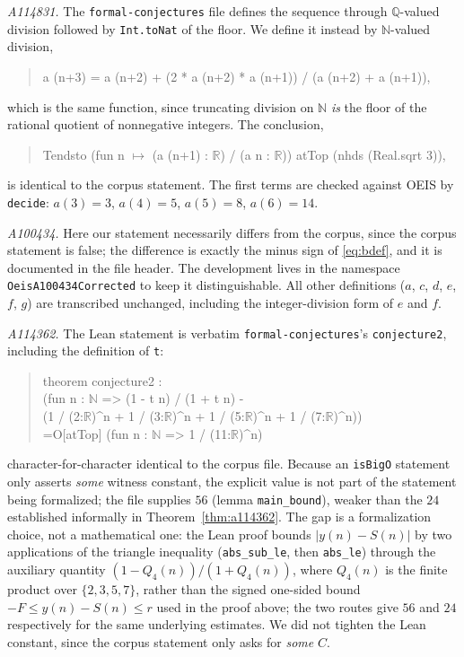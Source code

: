 \documentclass[11pt]{article}
\theoremstyle{plain}
\theoremstyle{definition}
\theoremstyle{remark}
\numberwithin{equation}{section}
\newcommand{\N}{\mathbb{N}}
\newcommand{\Q}{\mathbb{Q}}
\newcommand{\R}{\mathbb{R}}
\begin{document}
\emph{A114831.} The \texttt{formal-conjectures} file defines the sequence through
$\Q$-valued division followed by \texttt{Int.toNat} of the floor. We define it instead by
$\N$-valued division,
\begin{quote}\ttfamily\small
a (n+3) = a (n+2) + (2 * a (n+2) * a (n+1)) / (a (n+2) + a (n+1)),
\end{quote}
which is the same function, since truncating division on $\N$ \emph{is} the floor of the rational
quotient of nonnegative integers. The conclusion,
\begin{quote}\ttfamily\small
Tendsto (fun n $\mapsto$ (a (n+1) : $\R$) / (a n : $\R$)) atTop (nhds (Real.sqrt 3)),
\end{quote}
is identical to the corpus statement. The first terms are checked against OEIS by
\texttt{decide}: $a(3)=3$, $a(4)=5$, $a(5)=8$, $a(6)=14$.

\emph{A100434.} Here our statement necessarily differs from the corpus, since the corpus
statement is false; the difference is exactly the minus sign of \eqref{eq:bdef}, and it is
documented in the file header. The development lives in the namespace
\texttt{OeisA100434Corrected} to keep it distinguishable. All other definitions
($a$, $c$, $d$, $e$, $f$, $g$) are transcribed unchanged, including the integer-division form of
$e$ and $f$.

\emph{A114362.} The Lean statement is verbatim \texttt{formal-conjectures}'s \texttt{conjecture2},
including the definition of \texttt{t}:
\begin{quote}\ttfamily\small
theorem conjecture2 :\\
\hspace*{2em}(fun n : $\N$ => (1 - t n) / (1 + t n) -\\
\hspace*{4em}(1 / (2:$\R$)\textasciicircum{}n + 1 / (3:$\R$)\textasciicircum{}n +
1 / (5:$\R$)\textasciicircum{}n + 1 / (7:$\R$)\textasciicircum{}n))\\
\hspace*{2em}=O[atTop] (fun n : $\N$ => 1 / (11:$\R$)\textasciicircum{}n)
\end{quote}
character-for-character identical to the corpus file. Because an \texttt{isBigO} statement only
asserts \emph{some} witness constant, the explicit value is not part of the statement being
formalized; the file supplies $56$ (lemma \texttt{main\_bound}), weaker than the $24$ established
informally in Theorem~\ref{thm:a114362}. The gap is a formalization choice, not a mathematical
one: the Lean proof bounds $|y(n)-S(n)|$ by two applications of the triangle inequality
(\texttt{abs\_sub\_le}, then \texttt{abs\_le}) through the auxiliary quantity
$(1-Q_4(n))/(1+Q_4(n))$, where $Q_4(n)$ is the finite product over $\{2,3,5,7\}$, rather than the
signed one-sided bound $-F \le y(n)-S(n) \le r$ used in the proof above; the two routes give $56$
and $24$ respectively for the same underlying estimates. We did not tighten the Lean constant,
since the corpus statement only asks for \emph{some} $C$.
\end{document}
